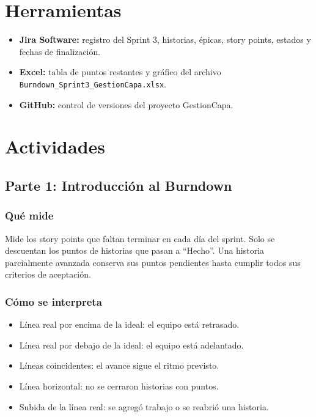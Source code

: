 \documentclass[12pt,a4paper]{article}
\begin{document}
\section{Herramientas}

\begin{itemize}
    \item \textbf{Jira Software:} registro del Sprint 3, historias, épicas,
    story points, estados y fechas de finalización.
    \item \textbf{Excel:} tabla de puntos restantes y gráfico del archivo
    \texttt{Burndown\_Sprint3\_GestionCapa.xlsx}.
    \item \textbf{GitHub:} control de versiones del proyecto GestionCapa.
\end{itemize}

\section{Actividades}

\subsection{Parte 1: Introducción al Burndown}

\subsubsection{Qué mide}

Mide los story points que faltan terminar en cada día del sprint. Solo se
descuentan los puntos de historias que pasan a ``Hecho''. Una historia
parcialmente avanzada conserva sus puntos pendientes hasta cumplir todos sus
criterios de aceptación.

\subsubsection{Cómo se interpreta}

\begin{itemize}
    \item Línea real por encima de la ideal: el equipo está retrasado.
    \item Línea real por debajo de la ideal: el equipo está adelantado.
    \item Líneas coincidentes: el avance sigue el ritmo previsto.
    \item Línea horizontal: no se cerraron historias con puntos.
    \item Subida de la línea real: se agregó trabajo o se reabrió una historia.
\end{itemize}
\end{document}
